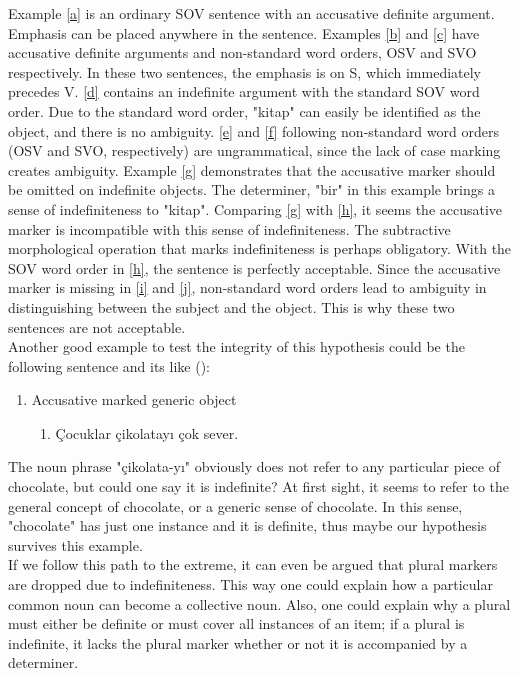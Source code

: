 \documentclass[11pt]{article} %
\begin{document}
Example \ref{a} is an ordinary SOV sentence with an accusative definite argument. Emphasis can be placed anywhere in the sentence. Examples \ref{b} and \ref{c} have accusative definite arguments and non-standard word orders, OSV and SVO respectively. In these two sentences, the emphasis is on S, which immediately precedes V. \ref{d} contains an indefinite argument with the standard SOV word order. Due to the standard word order, "kitap" can easily be identified as the object, and there is no ambiguity. \ref{e} and \ref{f} following non-standard word orders (OSV and SVO, respectively) are ungrammatical, since the lack of case marking creates ambiguity. Example \ref{g} demonstrates that the accusative marker should be omitted on indefinite objects. The determiner, "bir" in this example brings a sense of indefiniteness to "kitap". Comparing \ref{g} with \ref{h}, it seems the accusative marker is incompatible with this sense of indefiniteness. The subtractive morphological operation that marks indefiniteness is perhaps obligatory. With the SOV word order in \ref{h}, the sentence is perfectly acceptable. Since the accusative marker is missing in \ref{i} and \ref{j}, non-standard word orders lead to ambiguity in distinguishing between the subject and the object. This is why these two sentences are not acceptable. \\

Another good example to test the integrity of this hypothesis could be the following sentence and its like (\cite{Ozge2019pc}): %

\begin{enumerate}[resume*] 
	\item Accusative marked generic object \label{Gener}
	\begin{enumerate}[label=(\alph*), ref=(\alph*)]\itemsep1pt
	\item Çocuklar çikolatayı çok sever. \label{Cik}
	\end{enumerate}
\end{enumerate}

The noun phrase "çikolata-yı" obviously does not refer to any particular piece of chocolate, but could one say it is indefinite? At first sight, it seems to refer to the general concept of chocolate, or a generic sense of chocolate. In this sense, "chocolate" has just one instance and it is definite, thus maybe our hypothesis survives this example. \\ 

If we follow this path to the extreme, it can even be argued that plural markers are dropped due to indefiniteness. This way one could explain how a particular common noun can become a collective noun. Also, one could explain why a plural must either be definite or must cover all instances of an item; if a plural is indefinite, it lacks the plural marker whether or not it is accompanied by a determiner.
\end{document}
